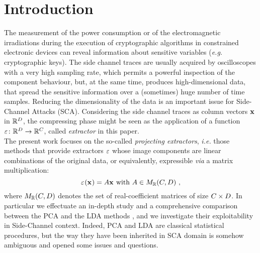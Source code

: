 \section{Introduction}
The measurement of the power consumption or of the electromagnetic irradiations during the execution of cryptographic algorithms in constrained electronic devices can reveal information about sensitive variables ({\em e.g.} cryptographic keys). The side channel traces are usually acquired by oscilloscopes with a very high sampling rate, which permits a powerful inspection of the component behaviour, but, at the same time, produces high-dimensional data, that spread the sensitive information over a (sometimes) huge number of time samples. Reducing the dimensionality of the data is an important issue for Side-Channel Attacks (SCA). Considering the side channel traces as column vectors ${\bf x}$ in $\mathbb{R}^\traceLength$, the compressing phase might be seen as the application of a function $\extract\colon \mathbb{R}^\traceLength\rightarrow \mathbb{R}^\newTraceLength$, called {\em extractor} in this paper.\\

The present work focuses on the so-called {\em projecting extractors}, {\em i.e.} those methods that provide extractors $\extract$ whose image components are linear combinations of the original data, or equivalently, expressible {\em via} a matrix multiplication:
\begin{equation}\label{eq:linearExtractor}
\extractor{\sss[]{}} = A\sss[]{} \mbox{ with } A \in M_{\mathbb{R}}(\newTraceLength, \traceLength) \mbox{ ,}
\end{equation}
where $ M_{\mathbb{R}}(\newTraceLength, \traceLength)$ denotes the set of real-coefficient matrices of size $\newTraceLength \times \traceLength$.  In particular we effectuate an in-depth study and a comprehensive comparison  between the PCA and the LDA methods \cite{fisher1938statistical,Fukunaga}, and we investigate their exploitability  in Side-Channel context.  Indeed, PCA and LDA are classical statistical procedures, but the way they have been inherited in SCA domain is somehow ambiguous and opened some issues and questions.\\


